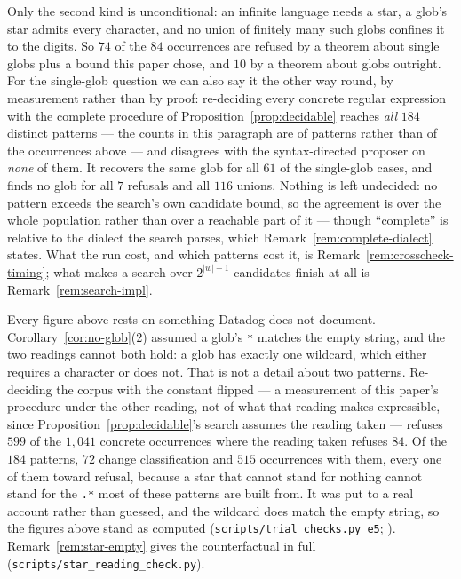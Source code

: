 Only the second kind is unconditional: an infinite language needs a star, a glob's star
admits every character, and no union of finitely many such globs confines it to the
digits. So
$74$ of the $84$ occurrences are refused by a theorem about single globs plus a bound
this paper chose, and $10$ by a theorem about globs outright. For
the single-glob question we can also say it the other way round, by measurement rather
than by proof: re-deciding every concrete regular expression with the complete procedure
of Proposition~\ref{prop:decidable} reaches \emph{all} $184$ distinct patterns --- the
counts in this paragraph are of patterns rather than of the occurrences above --- and
disagrees with the syntax-directed proposer on \emph{none} of them. It recovers the
same glob for all $61$ of the single-glob cases, and finds no glob for all $7$ refusals
and all $116$ unions. Nothing is left undecided: no pattern exceeds the search's own
candidate bound, so the agreement is over the whole population rather than over a
reachable part of it --- though ``complete'' is relative to the dialect the search
parses, which Remark~\ref{rem:complete-dialect} states. What the run cost, and which
patterns cost it, is Remark~\ref{rem:crosscheck-timing}; what makes a search over
$2^{|w|+1}$ candidates finish at all is Remark~\ref{rem:search-impl}.

Every figure above rests on something Datadog does not document.
Corollary~\ref{cor:no-glob}(2) assumed a glob's \texttt{*} matches the empty string, and
the two readings cannot both hold: a glob has exactly one wildcard, which either
requires a character or does not. That is not a detail about two patterns. Re-deciding
the corpus with the constant flipped --- a measurement of this paper's procedure under
the other reading, not of what that reading makes expressible, since
Proposition~\ref{prop:decidable}'s search assumes the reading taken --- refuses $599$ of
the $1{,}041$ concrete occurrences where the reading taken refuses $84$. Of the $184$
patterns, $72$ change classification and $515$ occurrences with them, every one of them
toward refusal, because a star that cannot stand for nothing cannot stand for the
\texttt{.*} most of these patterns are built from. It was put to a real account rather
than guessed, and the wildcard does match the empty string, so the figures above stand
as computed (\texttt{scripts\slash trial\_checks.py e5}; ).
Remark~\ref{rem:star-empty} gives the counterfactual in full
(\texttt{scripts\slash star\_reading\_check.py}).

